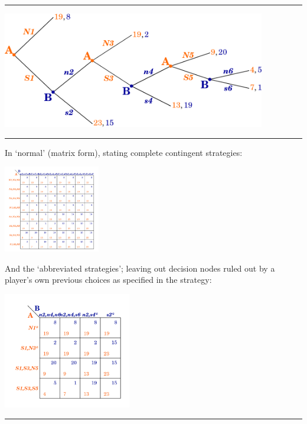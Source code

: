 \documentclass[]{article}
\begin{document}
\begin{center}\rule{0.5\linewidth}{\linethickness}\end{center}

\includegraphics[height=2in]{picsfigs/longgamework_randompayoffs_ul.png}

\begin{center}\rule{0.5\linewidth}{\linethickness}\end{center}

In `normal' (matrix form), stating complete contingent strategies:

\includegraphics[height=1.5in]{picsfigs/longgame_matrix_full.png}

\bigskip

And the `abbreviated strategies'; leaving out decision nodes ruled out
by a player's own previous choices as specified in the strategy:

\includegraphics[height=2in]{picsfigs/longgame_matrix_abbrev.png}

\begin{center}\rule{0.5\linewidth}{\linethickness}\end{center}
\end{document}
